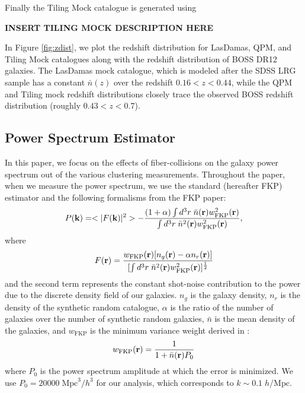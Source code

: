 \documentclass{emulateapj}
\begin{document}
Finally the Tiling Mock catalogue is generated using 

{\bf INSERT TILING MOCK DESCRIPTION HERE}

In Figure \ref{fig:zdist}, we plot the redshift distribution for LasDamas, QPM, and Tiling Mock catalogues along with the redshift distribution of BOSS DR12 galaxies. The LasDamas mock catalogue, which is modeled after the SDSS LRG sample has a constant $\bar{n}(z)$ over the redshift $0.16 < z< 0.44$, while the QPM and Tiling mock redshift distributions closely trace the observed BOSS redshift distribution (roughly $0.43 < z < 0.7$). 

\subsection{Power Spectrum Estimator} 
In this paper, we focus on the effects of fiber-collisions on the galaxy power spectrum out of the various clustering measurements. Throughout the paper, when we measure the power spectrum, we use the standard \cite{Feldman:1994aa} (hereafter FKP) estimator and the following formalisms from the FKP paper: 
\begin{equation} \label{eq:fkppk}
P({\bf k}) = <|F({\bf k})|^2> - \frac{(1+\alpha) \int d^3r \;\bar{n}({\bf r})w_{\mathrm{FKP}}^2({\bf r})} {\int d^3r \; \bar{n}^2({\bf r})w_{\mathrm{FKP}}^2({\bf r})},
\end{equation}  
where
\begin{equation}
F({\bf r}) = \frac{w_\mathrm{FKP}({\bf r}) [n_g({\bf r}) - \alpha n_r({\bf r})]} {[\int d^3r \; \bar{n}^2({\bf r})w_\mathrm{FKP}^2({\bf r})]^{\frac{1}{2}}} 
\end{equation}
and the second term represents the constant shot-noise contribution to the power due to the discrete density field of our galaxies. $n_g$ is the galaxy density, $n_r$ is the density of the synthetic random catalogue, $\alpha$ is the ratio of the number of galaxies over the number of synthetic random galaxies, $\bar{n}$ is the mean density of the galaxies, and $w_{\mathrm{FKP}}$ is the minimum variance weight derived in \cite{Feldman:1994aa}: 
\begin{equation}
w_{\mathrm{FKP}} ({\bf r}) = \frac{1}{1+\bar{n}({\bf r}) P_0}
\end{equation}
where $P_0$ is the power spectrum amplitude at which the error is minimized. We use $P_0 = 20000\; \mathrm{Mpc}^3/h^3$ for our analysis, which corresponds to $k \sim 0.1\; h/\mathrm{Mpc}$.  
\end{document}
